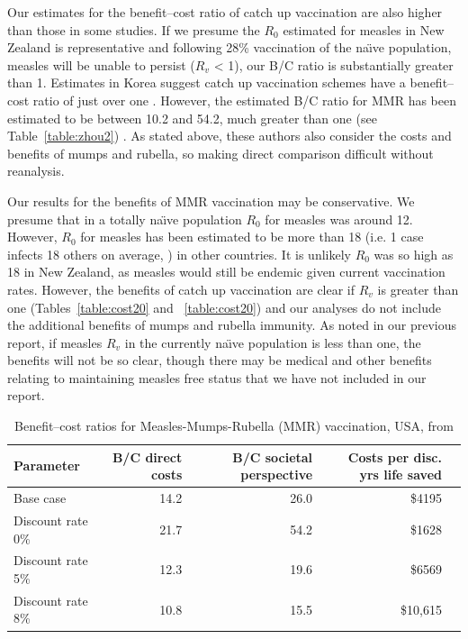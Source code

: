 \documentclass{article}
\begin{document}
Our estimates for the benefit--cost ratio of catch up vaccination are also higher than those in some studies. If we presume the $R_0$ estimated for measles in New Zealand is representative and following 28\% vaccination of the na\"{\i}ve population, measles will be unable to persist ($R_v$ < 1), our B/C ratio is substantially greater than 1. Estimates in Korea suggest catch up vaccination schemes have a benefit--cost ratio of just over one \citep{bae13}. However,  the estimated B/C ratio for MMR has been estimated to be between 10.2 and 54.2, much greater than one (see Table~\autoref{table:zhou2}) \citep{zhou4}. As stated above, these authors also consider the costs and benefits of mumps and rubella, so making direct comparison difficult without reanalysis.

Our results for the benefits of MMR vaccination may be conservative. We presume that in a totally na\"{\i}ve population $R_0$ for measles was around 12. However, $R_0$ for measles has been estimated to be more than 18 (i.e. 1 case infects 18 others on average, \citep{anderson91}) in other countries. It is unlikely $R_0$ was so high as 18 in New Zealand, as measles would still be endemic given current vaccination rates. However, the benefits of catch up vaccination are clear if $R_v$ is greater than one (Tables~\autoref{table:cost20} and ~\autoref{table:cost20}) and our analyses do not include the additional benefits of mumps and rubella immunity. As noted in our previous report, if measles $R_v$ in the currently na\"{\i}ve population is less than one, the benefits will not be so clear, though there may be medical and other benefits relating to maintaining measles free status that we have not included in our report.

\begin{table}
\tiny
\begin{center}
\begin{tabular}{lrrrr}
\hline
Parameter & B/C direct costs & B/C societal
perspective & Costs per disc. yrs life saved\\
\hline
Base case & 14.2 & 26.0 & \$4195 \\
Discount rate 0\% & 21.7 & 54.2 & \$1628 \\
Discount rate 5\% & 12.3 & 19.6 & \$6569 \\
Discount rate 8\% & 10.8 & 15.5 & \$10,615 \\
\hline
\end{tabular}
\end{center}
\caption{Benefit--cost ratios for Measles-Mumps-Rubella (MMR) vaccination, USA, from \citep{zhou4}}
\label{table:zhou2}
\end{table}%
\end{document}
